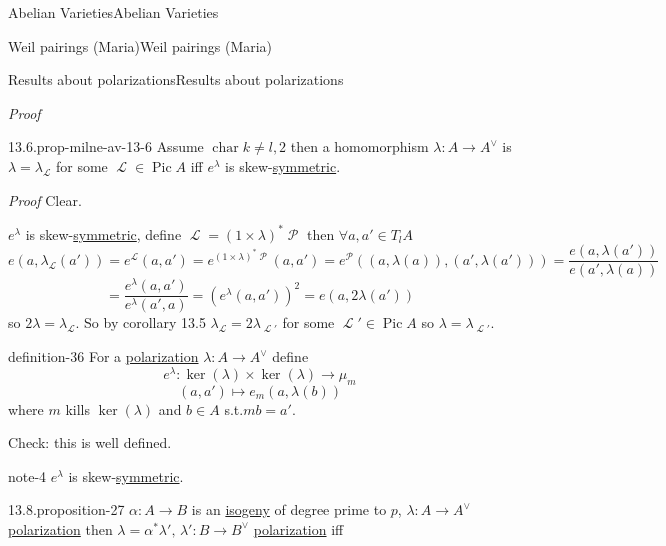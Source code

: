 \documentclass[10pt,]{book}
\makeatletter
\renewcommand*{\proofname}{Proof}
\renewenvironment{proof}[1][\proofname]{\par
  \pushQED{\qed}%
  \normalfont \topsep6\p@\@plus6\p@\relax
  \trivlist
  \item\relax
    {\itshape
    #1\@addpunct{.}}\hspace\labelsep\ignorespaces
}{%
  \popQED\endtrivlist\@endpefalse
}
\numberwithin{equation}{section}
\newcommand{\sheaf}[1]{\operatorname{\mathcal{#1}}}
\DeclareMathOperator{\Pic}{Pic}
\DeclareMathOperator{\characteristic}{char}
\makeatother
\begin{document}
\begin{chapterptx}{Abelian Varieties}{}{Abelian Varieties}{}{}
\begin{sectionptx}{Weil pairings (Maria)}{}{Weil pairings (Maria)}{}{}
\begin{subsectionptx}{Results about polarizations}{}{Results about polarizations}{}{}
\begin{proof}
%
\end{proof}
\begin{proposition}{13.6.}{}{prop-milne-av-13-6}%
\hypertarget{p-316}{}%
Assume \(\characteristic k \ne l,2\) then a homomorphism \(\lambda\colon A\to A^\vee\) is \(\lambda = \lambda_{\sheaf L}\) for some \(\sheaf L \in \Pic A\) iff \(e^\lambda\) is skew-\hyperref[def-princ-pol]{symmetric}.%
\end{proposition}
\begin{proof}\hypertarget{proof-53}{}
\hypertarget{case-11}{}\hypertarget{p-317}{}%
Clear.%
\par\medskip\noindent
\hypertarget{case-12}{}\hypertarget{p-318}{}%
\(e^\lambda\) is skew-\hyperref[def-princ-pol]{symmetric}, define \(\sheaf L = (1 \times \lambda)^* \sheaf P\) then  \(\forall a,a' \in T_l A\)%
\begin{equation*}
e(a,\lambda_{\sheaf L} (a') ) = e^{\sheaf L}(a,a') = e^{(1\times \lambda)^* \sheaf P} (a,a') = e^{\sheaf P}((a,\lambda (a)), (a',\lambda(a'))) = \frac{e(a,\lambda (a'))}{ e(a',\lambda(a))}
\end{equation*}
%
\begin{equation*}
= \frac{e^\lambda(a,a')}{ e^\lambda(a',a)} = (e^\lambda(a,a'))^2 = e(a,2\lambda (a'))
\end{equation*}
so \(2\lambda = \lambda_{\sheaf L}\). So by corollary 13.5 \(\lambda_{\sheaf L} = 2\lambda_{\sheaf L'}\) for some \(\sheaf L' \in \Pic A\) so \(\lambda = \lambda_{\sheaf L'}\).%
\end{proof}
\begin{definition}{}{definition-36}%
\hypertarget{p-319}{}%
For a  \hyperref[def-polarization]{polarization} \(\lambda \colon A\to A^\vee\) define%
\begin{equation*}
e^{\lambda} \colon \ker(\lambda)\times \ker(\lambda) \to \mu_m
\end{equation*}
%
\begin{equation*}
(a,a')\mapsto e_m(a,\lambda(b))
\end{equation*}
where \(m \) kills \(\ker(\lambda)\) and \(b \in A\) s.t.\(mb = a'\).%
\end{definition}
\hypertarget{p-320}{}%
Check: this is well defined.%
\begin{note}{}{note-4}%
\hypertarget{p-321}{}%
\(e^\lambda\) is skew-\hyperref[def-princ-pol]{symmetric}.%
\end{note}
\begin{proposition}{13.8.}{}{proposition-27}%
\hypertarget{p-322}{}%
\(\alpha\colon A \to B\) is an \hyperref[def-supersing-isog-isog]{isogeny} of degree prime to \(p\), \(\lambda\colon A\to A^\vee\) \hyperref[def-polarization]{polarization} then \(\lambda = \alpha^* \lambda', \,\lambda' \colon B\to B^\vee\) \hyperref[def-polarization]{polarization} iff%

\end{proposition}
\end{subsectionptx}
\end{sectionptx}
\end{chapterptx}
\end{document}
